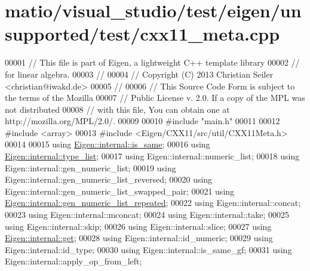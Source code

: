 \hypertarget{matio_2visual__studio_2test_2eigen_2unsupported_2test_2cxx11__meta_8cpp_source}{}\section{matio/visual\+\_\+studio/test/eigen/unsupported/test/cxx11\+\_\+meta.cpp}
\label{matio_2visual__studio_2test_2eigen_2unsupported_2test_2cxx11__meta_8cpp_source}

\begin{DoxyCode}
00001 \textcolor{comment}{// This file is part of Eigen, a lightweight C++ template library}
00002 \textcolor{comment}{// for linear algebra.}
00003 \textcolor{comment}{//}
00004 \textcolor{comment}{// Copyright (C) 2013 Christian Seiler <christian@iwakd.de>}
00005 \textcolor{comment}{//}
00006 \textcolor{comment}{// This Source Code Form is subject to the terms of the Mozilla}
00007 \textcolor{comment}{// Public License v. 2.0. If a copy of the MPL was not distributed}
00008 \textcolor{comment}{// with this file, You can obtain one at http://mozilla.org/MPL/2.0/.}
00009 
00010 \textcolor{preprocessor}{#include "main.h"}
00011 
00012 \textcolor{preprocessor}{#include <array>}
00013 \textcolor{preprocessor}{#include <Eigen/CXX11/src/util/CXX11Meta.h>}
00014 
00015 \textcolor{keyword}{using} \hyperlink{struct_eigen_1_1internal_1_1is__same}{Eigen::internal::is\_same};
00016 \textcolor{keyword}{using} \hyperlink{struct_eigen_1_1internal_1_1type__list}{Eigen::internal::type\_list};
00017 \textcolor{keyword}{using} Eigen::internal::numeric\_list;
00018 \textcolor{keyword}{using} Eigen::internal::gen\_numeric\_list;
00019 \textcolor{keyword}{using} Eigen::internal::gen\_numeric\_list\_reversed;
00020 \textcolor{keyword}{using} Eigen::internal::gen\_numeric\_list\_swapped\_pair;
00021 \textcolor{keyword}{using} \hyperlink{struct_eigen_1_1internal_1_1gen__numeric__list__repeated}{Eigen::internal::gen\_numeric\_list\_repeated};
00022 \textcolor{keyword}{using} Eigen::internal::concat;
00023 \textcolor{keyword}{using} Eigen::internal::mconcat;
00024 \textcolor{keyword}{using} Eigen::internal::take;
00025 \textcolor{keyword}{using} Eigen::internal::skip;
00026 \textcolor{keyword}{using} Eigen::internal::slice;
00027 \textcolor{keyword}{using} \hyperlink{struct_eigen_1_1internal_1_1get}{Eigen::internal::get};
00028 \textcolor{keyword}{using} Eigen::internal::id\_numeric;
00029 \textcolor{keyword}{using} Eigen::internal::id\_type;
00030 \textcolor{keyword}{using} Eigen::internal::is\_same\_gf;
00031 \textcolor{keyword}{using} Eigen::internal::apply\_op\_from\_left;

\end{DoxyCode}

